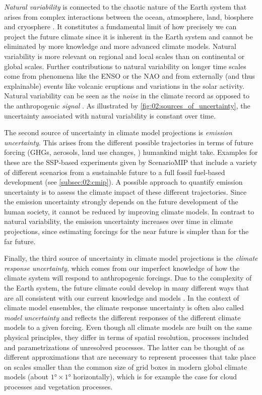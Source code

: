 \emph{Natural variability} is connected to the chaotic nature of the Earth
system that arises from complex interactions between the ocean, atmosphere,
land, biosphere and cryosphere \autocite{Cubasch2013}. It constitutes a
fundamental limit of how precisely we can project the future climate since it
is inherent in the Earth system and cannot be eliminated by more knowledge and
more advanced climate models. Natural variability is more relevant on regional
and local scales than on continental or global scales. Further contributions to
natural variability on longer time scales come from phenomena like the
\ac{ENSO} or the \ac{NAO} and from externally (and thus explainable) events
like volcanic eruptions and variations in the solar activity. Natural
variability can be seen as the \emph{noise} in the climate record as opposed to
the anthropogenic \emph{signal} \autocite{Cubasch2013}. As illustrated by
\cref{fig:02:sources_of_uncertainty}, the uncertainty associated with natural
variability is constant over time.

The second source of uncertainty in climate model projections is \emph{emission
  uncertainty}. This arises from the different possible trajectories in terms
of future forcing (\acp{GHG}, aerosols, land use changes, \etc{}) humankind
might take. Examples for these are the \ac{SSP}-based experiments given by
\ac{ScenarioMIP} that include a variety of different scenarios from a
sustainable future to a full fossil fuel-based development (see
\cref{subsec:02:cmip}). A possible approach to quantify emission uncertainty is
to assess the climate impact of these different trajectories. Since the
emission uncertainty strongly depends on the future development of the human
society, it cannot be reduced by improving climate models. In contrast to
natural variability, the emission uncertainty increases over time in climate
projections, since estimating forcings for the near future is simpler than for
the far future.

Finally, the third source of uncertainty in climate model projections is the
\emph{climate response uncertainty}, which comes from our imperfect knowledge
of how the climate system will respond to anthropogenic forcings. Due to the
complexity of the Earth system, the future climate could develop in many
different ways that are all consistent with our current knowledge and models
\autocite{Cubasch2013}. In the context of climate model ensembles, the climate
response uncertainty is often also called \emph{model uncertainty} and reflects
the different responses of the different climate models to a given forcing.
Even though all climate models are built on the same physical principles, they
differ in terms of spatial resolution, processes included and parametrizations
of unresolved processes. The latter can be thought of as different
approximations that are necessary to represent processes that take place on
scales smaller than the common size of grid boxes in modern global climate
models (about $\ang{1} \times \ang{1}$ horizontally), which is for example the
case for cloud processes and vegetation processes.

